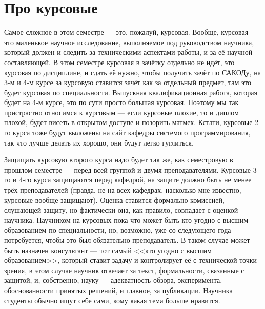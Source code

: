 \documentclass[a5paper]{article}
\begin{document}
\section{Про курсовые}

Самое сложное в этом семестре --- это, пожалуй, курсовая. Вообще, курсовая --- это маленькое научное исследование, выполняемое под руководством научника, который должен и следить за техническими аспектами работы, и за её научной составляющей. В этом семестре курсовая в зачётку отдельно не идёт, это курсовая по дисциплине, и сдать её нужно, чтобы получить зачёт по САКОДу, на 3-м и 4-м курсе за курсовую ставится зачёт как за отдельный предмет, там это будет курсовая по специальности. Выпускная квалификационная работа, которая будет на 4-м курсе, это по сути просто большая курсовая. Поэтому мы так пристрастно относимся к курсовым --- если курсовые плохие, то и диплом плохой, будет висеть в открытом доступе и позорить матмех. Кстати, курсовые 2-го курса тоже будут выложены на сайт кафедры системого программирования, так что лучше делать их хорошо, они будут легко гуглиться. 

Защищать курсовую второго курса надо будет так же, как семестровую в прошлом семестре --- перед всей группой и двумя преподавателями. Курсовые 3-го и 4-го курса защищаются перед кафедрой, на защите должно быть не менее трёх преподавателей (правда, не на всех кафедрах, насколько мне известно, курсовые вообще защищают). Оценка ставится формально комиссией, слушающей защиту, но фактически она, как правило, совпадает с оценкой научника. Научником на курсовых пока что может быть кто угодно с высшим образованием по специальности, но, возможно, уже со следующего года потребуется, чтобы это был обязательно преподаватель. В таком случае может быть назначен консультант --- тот самый <<кто угодно с высшим образованием>>, который ставит задачу и контролирует её с технической точки зрения, в этом случае научник отвечает за текст, формальности, связанные с защитой, и, собственно, науку --- адекватность обзора, эксперимента, обоснованности принятых решений, и главное, за публикации. Научника студенты обычно ищут себе сами, кому какая тема больше нравится.
\end{document}

